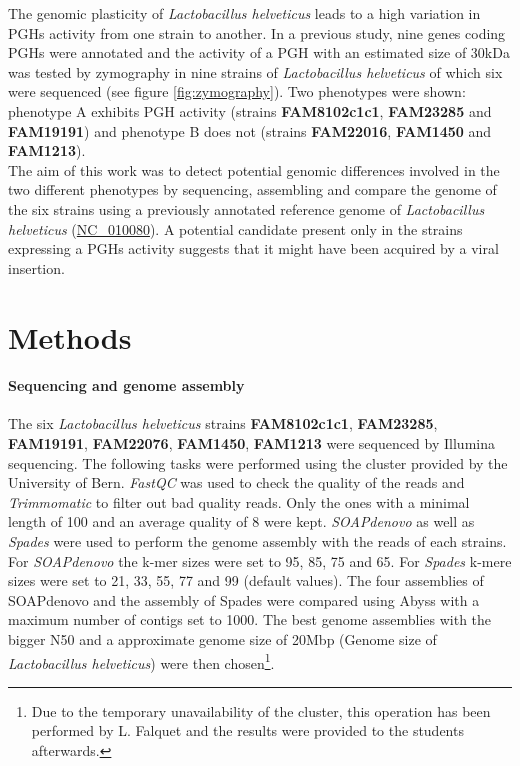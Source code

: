 \documentclass[10pt,a4paper]{article}
\begin{document}
\noindent The genomic plasticity of \textit{Lactobacillus helveticus} leads to a high variation in PGHs activity from one strain to another. 
In a previous study\cite{jebava_nine_2011}, nine genes coding PGHs were annotated and the activity of a PGH with an estimated size of 30kDa was tested by zymography in nine strains of \textit{Lactobacillus helveticus} of which six were sequenced (see figure \ref{fig:zymography}). Two phenotypes were shown: phenotype A exhibits PGH activity (strains \textbf{FAM8102c1c1}, \textbf{FAM23285} and \textbf{FAM19191}) and phenotype B does not (strains \textbf{FAM22016}, \textbf{FAM1450} and \textbf{FAM1213}).\\

\noindent The aim of this work was to detect potential genomic differences involved in the two different phenotypes by sequencing, assembling and compare the genome of the six strains using a previously annotated reference genome of \textit{Lactobacillus helveticus} (\href{https://www.ncbi.nlm.nih.gov/genome/?term=NC_010080}{NC\_010080}). A potential candidate present only in the strains expressing a PGHs activity suggests that it might have been acquired by a viral insertion. 

  


\section*{Methods}

\paragraph{Sequencing and genome assembly}
The six \textit{Lactobacillus helveticus} strains \textbf{FAM8102c1c1}, \textbf{FAM23285}, \textbf{FAM19191}, \textbf{FAM22076}, \textbf{FAM1450}, \textbf{FAM1213}  were sequenced by Illumina sequencing. The following tasks were performed using the cluster provided by the University of Bern.  \textit{FastQC}\cite{andrews2012} was used to check the quality of the reads and \textit{Trimmomatic}\cite{bolger_trimmomatic:_2014} to filter out bad quality reads. Only the ones with a minimal length of 100 and an average quality of 8 were kept. \textit{SOAPdenovo} as well as \textit{Spades} were used to perform the genome assembly with the reads of each strains. For \textit{SOAPdenovo} the k-mer sizes were set to 95, 85, 75 and 65. For \textit{Spades} k-mere sizes were set to 21, 33, 55, 77 and 99 (default values). The four assemblies of SOAPdenovo and the assembly of Spades were compared using Abyss with a maximum number of contigs set to 1000. The best genome assemblies with the bigger N50 and a approximate genome size of 20Mbp (Genome size of \textit{Lactobacillus helveticus}) were then chosen\footnote{Due to the temporary unavailability of the cluster, this operation has been performed by L. Falquet and the results were provided to the students afterwards.}.
\end{document}
